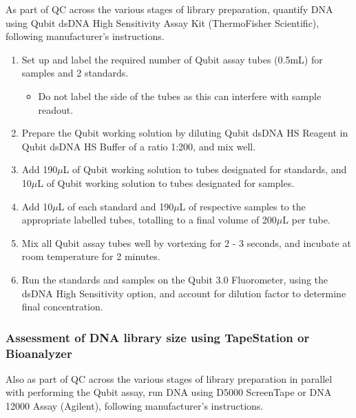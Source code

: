 \label{Isoseq_Protocol_qubit}
As part of QC across the various stages of library preparation, quantify DNA using Qubit dsDNA High Sensitivity Assay Kit (ThermoFisher Scientific), following manufacturer's instructions.  	
\begin{enumerate}
	\item Set up and label the required number of Qubit assay tubes (0.5mL) for samples and 2 standards. 
	\begin{itemize}
		\item Do not label the side of the tubes as this can interfere with sample readout. 
	\end{itemize} 
	\item Prepare the Qubit working solution by diluting Qubit dsDNA HS Reagent in Qubit dsDNA HS Buffer of a ratio 1:200, and mix well. 
	\item Add 190$\mu$L of Qubit working solution to tubes designated for standards, and 10$\mu$L of Qubit working solution to tubes designated for samples. 
	\item Add 10$\mu$L of each standard and 190$\mu$L of respective samples to the appropriate labelled tubes, totalling to a final volume of 200$\mu$L per tube.
	\item Mix all Qubit assay tubes well by vortexing for 2 - 3 seconds, and incubate at room temperature for 2 minutes. 
	\item Run the standards and samples on the Qubit 3.0 Fluorometer, using the dsDNA High Sensitivity option, and account for dilution factor to determine final concentration. 
\end{enumerate}

\subsubsection{Assessment of DNA library size using TapeStation or Bioanalyzer}
\label{Isoseq_Protocol_tapestation_bioanalyzer}
Also as part of QC across the various stages of library preparation in parallel with performing the Qubit assay, run DNA using D5000 ScreenTape or DNA 12000 Assay (Agilent), following manufacturer's instructions. 

